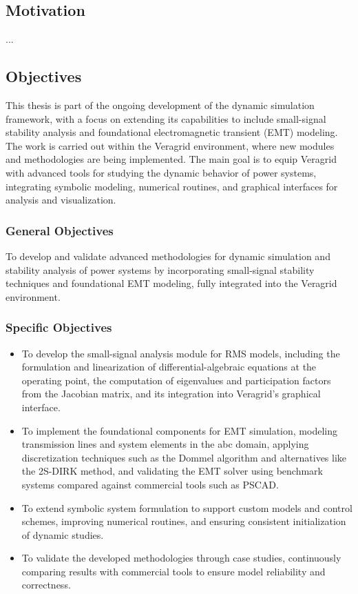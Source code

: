 \subsection{Motivation}

...

\subsection{Objectives}

This thesis is part of the ongoing development of the dynamic simulation framework, 
with a focus on extending its capabilities to include small-signal stability analysis and foundational electromagnetic transient (EMT) modeling. 
The work is carried out within the Veragrid environment, where new modules and methodologies are being implemented. 
The main goal is to equip Veragrid with advanced tools for studying the dynamic behavior of power systems, integrating symbolic modeling, numerical routines,
and graphical interfaces for analysis and visualization.

\subsubsection*{General Objectives}

To develop and validate advanced methodologies for dynamic simulation and stability analysis of power systems by incorporating small-signal stability techniques and foundational EMT modeling, fully integrated into the Veragrid environment.

\subsubsection*{Specific Objectives}

\begin{itemize}
    \item To develop the small-signal analysis module for RMS models, including the formulation and linearization of differential-algebraic equations at the operating point, the computation of eigenvalues and participation factors from the Jacobian matrix, and its integration into Veragrid’s graphical interface.
    \item To implement the foundational components for EMT simulation, modeling transmission lines and system elements in the abc domain, applying discretization techniques such as the Dommel algorithm and alternatives like the 2S-DIRK method, and validating the EMT solver using benchmark systems compared against commercial tools such as PSCAD.
    \item To extend symbolic system formulation to support custom models and control schemes, improving numerical routines, and ensuring consistent initialization of dynamic studies.
    \item To validate the developed methodologies through case studies, continuously comparing results with commercial tools to ensure model reliability and correctness.
\end{itemize}





